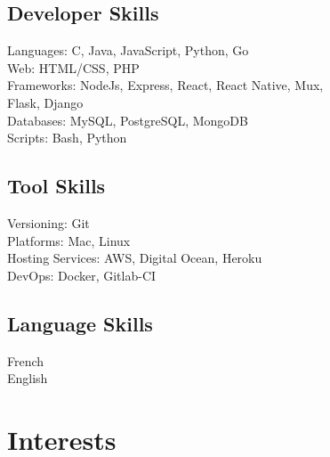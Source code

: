 \documentclass[a4paper]{deedy-resume} %
\begin{document}
\begin{minipage}[t]{0.55\textwidth}

\subsection{Developer Skills}

\textbullet{} Languages: C, Java, JavaScript, Python, Go  \\
\textbullet{} Web: HTML/CSS, PHP \\
\textbullet{} Frameworks: NodeJs, Express, React, React Native, Mux,\\  Flask, Django \\
\textbullet{} Databases: MySQL, PostgreSQL, MongoDB \\
\textbullet{} Scripts: Bash, Python

\end{minipage}
\begin{minipage}[t]{0.39\textwidth}

\subsection{Tool Skills}

\textbullet{} Versioning: Git \\
\textbullet{} Platforms: Mac, Linux \\
\textbullet{} Hosting Services: AWS, Digital Ocean, Heroku \\
\textbullet{} DevOps: Docker, Gitlab-CI 

\end{minipage}

\begin{minipage}[t]{0.29\textwidth}

\insectionspace 
\sectionspace
\subsection{Language Skills}

French\\
English

\end{minipage}

\sectionspace %



\section{Interests}
\end{document}
